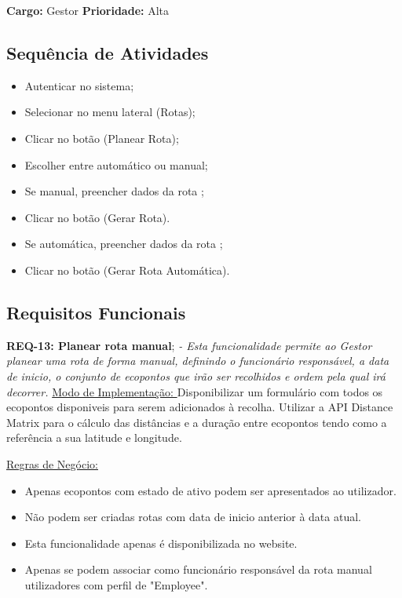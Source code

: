 \documentclass{scrreprt}
\begin{document}
	\textbf{Cargo: }Gestor  \newline
	\textbf{Prioridade: }Alta \newline
	
	\subsection{Sequência de Atividades}
	
	\begin{itemize}
		\item Autenticar no sistema;
		\item Selecionar no menu lateral (Rotas);
		\item Clicar no botão (Planear Rota);
		\item Escolher entre automático ou manual;
		\item Se manual, preencher dados da rota ;
		\item Clicar no botão (Gerar Rota).
		\item Se automática, preencher dados da rota ;
		\item Clicar no botão (Gerar Rota Automática).
	\end{itemize}
	
	\subsection{Requisitos Funcionais}
	\textbf{REQ-13: Planear rota manual};\newline
	     \textit{- Esta funcionalidade permite ao Gestor planear uma rota de forma manual, definindo o funcionário responsável, a data de inicio, o conjunto de ecopontos que irão ser recolhidos e ordem pela qual irá decorrer.} \newline\newline
		\underline{Modo de Implementação: }Disponibilizar um formulário com todos os ecopontos disponiveis para serem adicionados à recolha. Utilizar a API Distance Matrix para o cálculo das distâncias e a duração entre ecopontos tendo como a referência a sua latitude e longitude. \newline\newline
		
		\underline{Regras de Negócio: } 
		\begin{itemize}
		\item Apenas ecopontos com estado de ativo podem ser apresentados ao utilizador.
		\item Não podem ser criadas rotas com data de inicio anterior à data atual.
	    \item  Esta funcionalidade apenas é disponibilizada no website.
	    \item Apenas se podem associar como funcionário responsável da rota manual utilizadores com perfil de "Employee". 
	\end{itemize}
	
\end{document}
